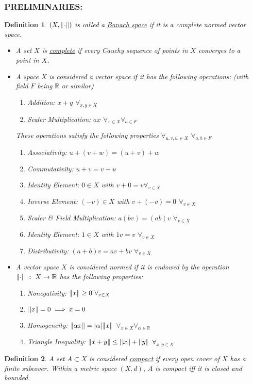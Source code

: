 \documentclass[]{article}
\newcommand{\Preliminaries}{\subsubsection*{\textbf{PRELIMINARIES:}}}
\newcommand{\R}{\mathbb{R}}
\newcommand{\st}{\ : \ }
\newtheorem{definition}{Definition}
\begin{document}
\Preliminaries
\begin{definition}
    $(X, \norm{\cdot})$ is called a \emph{\underline{Banach space}} if it is a complete normed vector space.
    \begin{itemize}
        \item A set $X$ is \emph{\underline{complete}} if every Cauchy sequence of points in $X$ converges to a point in $X$.
        \item A space $X$ is considered a vector space if it has the following operations: 
        (with field $F$ being $\R$ or similar)
        \begin{enumerate}
            \item Addition: $x + y$ $\forall_{x,y \in X}$
            \item Scaler Multiplication: $ax$ $\forall_{x \in X} \forall_{a \in F}$
        \end{enumerate}
        These operations satisfy the following properties $\forall_{u,v,w \in X}$ $\forall_{a,b \in F}$
        \begin{enumerate}
            \item Associativity: $u + (v + w) = (u + v) + w$
            \item Commutativity: $u + v = v + u$
            \item Identity Element: $0 \in X$ with $v + 0 = v \forall_{v \in X}$
            \item Inverse Element: $(-v) \in X$ with $v + (-v) = 0$ $\forall_{v \in X}$
            \item Scaler \& Field Multiplication: $a(bv) = (ab) v$ $ \forall_{v \in X}$
            \item Identity Element: $1 \in X$ with $1 v = v$ $\forall_{v \in X}$
            \item Distributivity: $(a + b) v = a v + b v$ $\forall_{v \in X}$
        \end{enumerate}
        \item A vector space $X$ is considered normed if it is endowed by the operation $\norm{\cdot} \st X \to \R$ has the following properties:
        \begin{enumerate}
            \item Nonegativity: $\norm{x} \geq 0  \ \forall_{x \in X}$
            \item $\norm{x} = 0 \implies x = 0$
            \item Homogeneity: $\norm{\alpha x} = \abs{\alpha} \norm{x}$ $\forall_{x \in X} \forall_{\alpha \in \R}$
            \item Triangle Inequality: $\norm{x + y} \leq \norm{x} + \norm{y}$ $\forall_{x,y \in X}$
        \end{enumerate}
    \end{itemize}
\end{definition}
\begin{definition}
    A set $A \subset X$ is considered \emph{\underline{compact}} if every open cover of $X$ has a finite subcover.
    Within a metric space $(X,d)$, $A$ is compact iff it is closed and bounded.
\end{definition}
\end{document}
